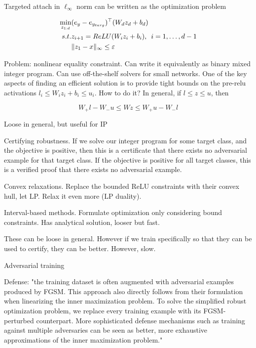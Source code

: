 \documentclass[english]{article}
\begin{document}
Targeted attach in $\ell_\infty$ norm can be written as the optimization problem

\begin{align*}
\min_{z_{1:d}}& (e_y-e_{y_{targ}})^\top (W_d z_d + b_d)\\
s.t.& z_{i+1}= ReLU(W_iz_i+b_i),\,\,\,i=1,\ldots,d-1\\
&\|z_1-x\|_\infty\le \varepsilon
\end{align*}

Problem: nonlinear equality constraint. Can write it equivalently as binary mixed integer program. Can use off-the-shelf solvers for small networks. One of the key aspects of finding an efficient solution is to provide tight bounds on the pre-relu activations $l_i \le W_iz_i+b_i \le u_i$. How to do it?  In general, if $l\le z\le u$, then 

$$W_+l-W_-u\le Wz \le W_+u-W_-l$$

Loose in general, but useful for IP

\item Certifying robustness. If we solve our integer program for some target class, and the objective is positive, then this is a certificate that there exists no adversarial example for that target class. If the objective is positive for all target classes, this is a verified proof that there exists no adversarial example.

\item Convex relaxations. Replace the bounded ReLU constraints with their convex hull, let LP. Relax it even more (LP duality).

Interval-based methods. Formulate optimization only considering bound constraints. Has analytical solution, looser but fast.

These can be loose in general. However if we train specifically so that they can be used to certify, they can be better. However, slow.

\eenum 

\item Adversarial training
\benum 

\item Defense: "the training dataset is often augmented with adversarial examples produced
by FGSM. This approach also directly follows from their formulation when linearizing the inner maximization
problem. To solve the simplified robust optimization problem, we replace every training example
with its FGSM-perturbed counterpart. More sophisticated defense mechanisms such as training
against multiple adversaries can be seen as better, more exhaustive approximations of the inner
maximization problem."
\end{document}
